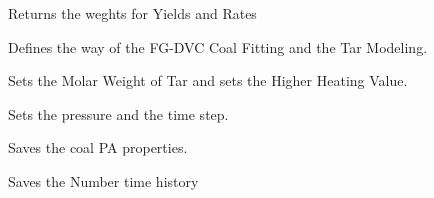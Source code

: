 \documentclass[letterpaper,10pt,english]{sphinxmanual}
\begin{document}
\begin{fulllineitems}
\begin{fulllineitems}
\end{fulllineitems}


\begin{fulllineitems}
\label{GUI:PKPgui.InfosFromGUI.WeightYR}
Returns the weghts for Yields and Rates

\end{fulllineitems}


\begin{fulllineitems}
\label{GUI:PKPgui.InfosFromGUI.setFGCoalProp}
Defines the way of the FG-DVC Coal Fitting and the Tar Modeling.

\end{fulllineitems}


\begin{fulllineitems}
\label{GUI:PKPgui.InfosFromGUI.setMwsHHV}
Sets the Molar Weight of Tar and sets the Higher Heating Value.

\end{fulllineitems}


\begin{fulllineitems}
\label{GUI:PKPgui.InfosFromGUI.setOperCond}
Sets the pressure and the time step.

\end{fulllineitems}


\begin{fulllineitems}
\label{GUI:PKPgui.InfosFromGUI.setPA}
Saves the coal PA properties.

\end{fulllineitems}


\begin{fulllineitems}
\label{GUI:PKPgui.InfosFromGUI.setTimeHistories}
Saves the Number time history


\end{fulllineitems}
\end{fulllineitems}
\end{document}

